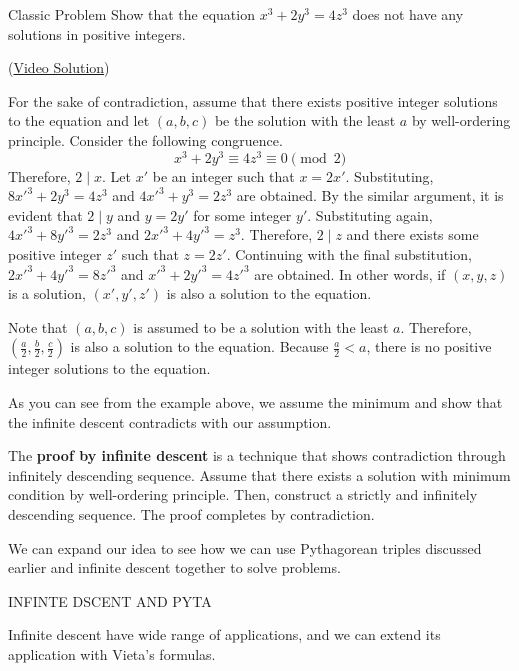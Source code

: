 \documentclass[../../main.tex]{subfiles}
\begin{document}
\begin{problem}{Classic Problem}{}
Show that the equation $x^3 + 2y^3 = 4z^3$ does not have any
solutions in positive integers.
\end{problem}
(\href{https://youtu.be/UJR56wT0NIM}{Video Solution})
\begin{solution}
For the sake of contradiction, assume that there exists positive
integer solutions to the equation and let $(a, b, c)$ be the
solution with the least $a$ by well-ordering principle.
Consider the following congruence.
\[
x^3 + 2y^3 \equiv 4z^3 \equiv 0 \pmod{2}
\]
Therefore, $2 \mid x$. Let $x'$ be an integer such that $x = 2x'$.
Substituting, $8x'^3 + 2y^3 = 4z^3$ and $4x'^3 + y^3 = 2z^3$ are
obtained. By the similar argument, it is evident that $2 \mid y$
and $y = 2y'$ for some integer $y'$. Substituting again,
$4x'^3 + 8y'^3 = 2z^3$ and $2x'^3 + 4y'^3 = z^3$. Therefore,
$2 \mid z$ and there exists some positive integer $z'$ such that
$z = 2z'$. Continuing with the final substitution,
$2x'^3 + 4y'^3 = 8z'^3$ and $x'^3 + 2y'^3 = 4z'^3$ are obtained.
In other words, if $(x, y, z)$ is a solution, $(x', y', z')$ is
also a solution to the equation.

Note that $(a, b, c)$ is assumed to be a solution with the least $a$.
Therefore, $(\frac{a}{2}, \frac{b}{2}, \frac{c}{2})$ is also a
solution to the equation. Because $\frac{a}{2} < a$, there is no
positive integer solutions to the equation.
\end{solution}

As you can see from the example above, we assume the minimum
and show that the infinite descent contradicts with our assumption.

\begin{definition}{}{}
The \textbf{proof by infinite descent} is a technique that shows
contradiction through infinitely descending sequence. Assume that
there exists a solution with minimum condition by well-ordering
principle. Then, construct a strictly and infinitely descending
sequence. The proof completes by contradiction.
\end{definition}

We can expand our idea to see how we can use Pythagorean triples
discussed earlier and infinite descent together to solve problems.

\begin{problem}{}{}
INFINTE DSCENT AND PYTA
\end{problem}

Infinite descent have wide range of applications, and we can
extend its application with Vieta's formulas.
\end{document}
